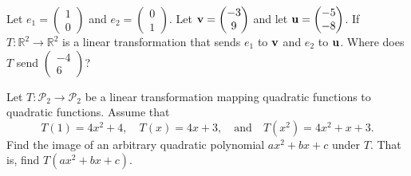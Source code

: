 \begin{problem}
    Let $e_1 = \begin{pmatrix}1\\0\end{pmatrix}$ and $e_2 =
        \begin{pmatrix}0\\1\end{pmatrix}$.  Let ${\bf v} = \begin{pmatrix}-3\\9\end{pmatrix}$ and let ${\bf u} =
            \begin{pmatrix}-5\\-8\end{pmatrix}$.
    If $T:\mathbb{R}^2 \to \mathbb{R}^2$ is a linear transformation that sends $e_1$ to
    ${\bf v}$ and $e_2$ to ${\bf u}$.  Where does $T$ send $\begin{pmatrix}-4\\6\end{pmatrix}$?
\end{problem}


\begin{problem}
    Let $T:\mathcal{P}_2 \to \mathcal{P}_2$ be a linear transformation mapping quadratic
    functions to quadratic functions.  Assume that 
    \[ T(1) = 4x^2 + 4, \quad T(x) = 4x+3, \quad \text{and} \quad T(x^2) = 4x^2 + x + 3.
        \]
    Find the image of an arbitrary quadratic polynomial $ax^2 + bx + c$ under $T$.  That
    is, find $T(ax^2 + bx + c)$.
\end{problem}




